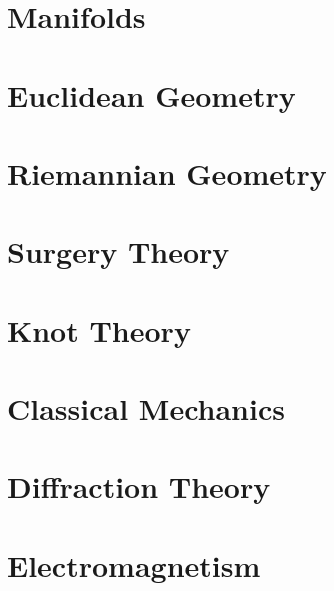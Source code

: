 \documentclass{book}                                                           %
\newcommand*{\TOPPATH}{books}
\newcommand*{\PATH}{\TOPPATH/}
\newcounter{endpage}
\begin{document}
        \part{Manifolds}
            
        \part{Euclidean Geometry}
            
        \part{Riemannian Geometry}
            
    \clearpage

    \setcounter{endpage}{\thepage}
        \label{book:Geometric_Topology}
        \renewcommand{\PATH}{\TOPPATH/Geometric_Topology}
        \setcounter{page}{\value{endpage}}
        \part{Surgery Theory}
            
        \part{Knot Theory}
            
    \clearpage

    \setcounter{endpage}{\thepage}
        \label{book:Physics}
        \renewcommand{\PATH}{\TOPPATH/Physics}
        \setcounter{page}{\value{endpage}}
        \part{Classical Mechanics}
            
        \part{Diffraction Theory}
            
            
            
        \part{Electromagnetism}
           
    \clearpage
\end{document}
